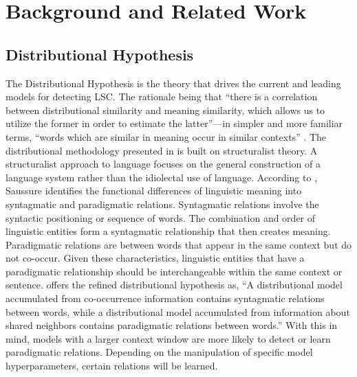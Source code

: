 \section{Background and Related Work}
\label{sec:background}

\subsection{Distributional Hypothesis}

The Distributional Hypothesis is the theory that drives the current and leading models for detecting LSC. The rationale being that “there is a correlation between distributional similarity and meaning similarity, which allows us to utilize the former in order to estimate the latter”—in simpler and more familiar terms, “words which are similar in meaning occur in similar contexts” \citep{sahlgren2008distributional}. The distributional methodology presented in \citet{harris1970distributional} is built on structuralist theory. A structuralist approach to language focuses on the general construction of a language system rather than the idiolectal use of language. According to \citet{sahlgren2008distributional}, Saussure identifies the functional differences of linguistic meaning into syntagmatic and paradigmatic relations. Syntagmatic relations involve the syntactic positioning or sequence of words. The combination and order of linguistic entities form a syntagmatic relationship that then creates meaning. Paradigmatic relations are between words that appear in the same context but do not co-occur. Given these characteristics, linguistic entities that have a paradigmatic relationship should be interchangeable within the same context or sentence. \citet{sahlgren2008distributional} offers the refined distributional hypothesis as, “A distributional model accumulated from co-occurrence information contains syntagmatic relations between words, while a distributional model accumulated from information about shared neighbors contains paradigmatic relations between words.” With this in mind, models with a larger context window are more likely to detect or learn paradigmatic relations. Depending on the manipulation of specific model hyperparameters, certain relations will be learned. 


